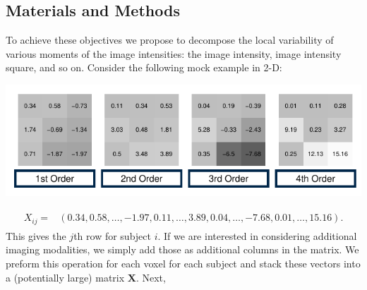 \documentclass[a0,landscape]{a0poster}
\begin{document}
\begin{multicols}{3}
\large{\section*{\color{uwred}Materials and Methods}}
\noindent To achieve these objectives we propose to decompose the local variability of various moments of the image intensities: the image intensity, image  intensity square, and so on. Consider the following mock example in 2-D:
\begin{center}\vspace{.25cm}
\includegraphics[width=1\linewidth]{ln_example_higherorder_poset.pdf}
\end{center}\vspace{.25cm}
\normalsize{
\begin{align*}
\begin{aligned}
X_{ij} = &(0.34, 0.58, \ldots, -1.97, 0.11, \ldots, 3.89, 0.04, \ldots, -7.68, 0.01, \ldots, 15.16).
\end{aligned}
\end{align*}}
\large
\noindent This gives the $j$th row for subject $i$. If we are interested in considering additional imaging modalities, we simply add those as additional columns in the matrix. We preform this operation for each voxel for each subject and stack these vectors into a (potentially large) matrix $\mathbf{X}$. Next,


\end{multicols}
\end{document}
